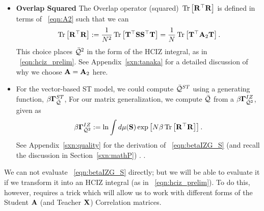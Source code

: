 \begin{itemize}
\item
 \textbf{Overlap Squared}
 The Overlap operator (squared)  $\mbox{}\operatorname{Tr}\left[\mathbf{R}^{\top}\mathbf{R}\right]$ is defined  in terms of \EQN~\ref{eqn:A2} such
 that we can 
\begin{align}
  \label{eqn:TraceR2withA2}
  \mbox{}\operatorname{Tr}\left[\mathbf{R}^{\top}\mathbf{R}\right]:=\frac{1}{N^{2}}\mbox{}\operatorname{Tr}\left[{\mathbf{T}}^{\top}{\mathbf{S}}{\mathbf{S}}^{\top}{\mathbf{T}}\right]
  =\frac{1}{N}\mbox{}\operatorname{Tr}\left[{\mathbf{T}}^{\top}\mathbf{A}_{2}{\mathbf{T}}\right]  .
\end{align}
This choice places $\bar{\mathcal{Q}}^{2}$ in the form of the HCIZ integral, as in \EQN~\ref{eqn:hciz_prelim}.
See Appendix~\ref{sxn:tanaka} for a detailed discussion of why we choose $\mathbf{A}=\mathbf{A}_{2}$ here.
  
\item
 \textbf{\GeneratingFunction}
 For the vector-based ST model, we could compute $\bar{\mathcal{Q}}^{ST}$ using a generating function, $\beta\mathbf{\Gamma}^{ST}_{\bar{\mathcal{Q}}}$,
For our matrix generalization, we compute $\bar{\mathcal{Q}}$ from a \emph{\LayerQualitySquared \GeneratingFunction} $\beta\mathbf{\Gamma}^{IZ}_{\bar{\mathcal{Q}}^{2}}$, given as
\begin{align}
  \label{eqn:betaIZG_S}
  \beta\mathbf{\Gamma}^{IZ}_{\bar{\mathcal{Q}}^{2}}:=  \ln \int d\mu(\mathbf{S}) \exp\left[N\beta\mbox{}\operatorname{Tr}\left[\mathbf{R}^{\top}\mathbf{R}\right]\right] .
\end{align}
See Appendix~\ref{sxn:quality} for the derivation of \EQN~\ref{eqn:betaIZG_S} (and recall the discussion in Section~\ref{sxn:mathP})
. 
.

\end{itemize}
%

We can not evaluate \EQN~\ref{eqn:betaIZG_S} directly; but we will be able to evaluate it if we transform it into an HCIZ integral (as in \EQN~\ref{eqn:hciz_prelim}). To do this, however, requires a trick which will allow us to work with different forms of the Student $\mathbf{A}$ (and Teacher $\mathbf{X}$) Correlation matrices.


